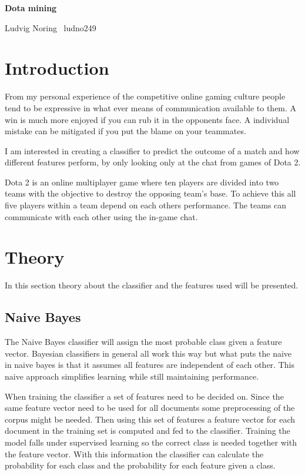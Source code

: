 \documentclass[12pt,a4paper]{article}
\begin{document}
\begin{center}
    \Huge
    \textbf{Dota mining}

    \vspace{0.3cm}
    \large
    Ludvig Noring \
    ludno249

\end{center}

\section{Introduction}
From my personal experience of the competitive online gaming culture
people tend to be expressive in what ever means of communication available to them.
A win is much more enjoyed if you can rub it in the opponents face.
A individual mistake can be mitigated if you put the blame on your teammates.

I am interested in creating a classifier to predict the outcome of a match and how different features perform,
by only looking only at the chat from games of Dota 2.

Dota 2 is an online multiplayer game where ten players are divided into two teams
with the objective to destroy the opposing team's base.
To achieve this all five players within a team depend on each others performance.
The teams can communicate with each other using the in-game chat.

\section{Theory}
In this section theory about the classifier and the features used will be presented.

\subsection{Naive Bayes}
The Naive Bayes classifier will assign the most probable class given a feature vector.
Bayesian classifiers in general all work this way but what puts the naive in naive bayes
is that it assumes all features are independent of each other.
This naive approach simplifies learning while still maintaining performance.\cite{bayes}

When training the classifier a set of features need to be decided on.
Since the same feature vector need to be used for all documents some preprocessing of the corpus
might be needed.
Then using this set of features a feature vector for each document in the training set is
computed and fed to the classifier.
Training the model falls under supervised learning so the correct class is needed together with the feature vector.
With this information the classifier can calculate the probability for each class and the probability for each feature given a class.
\end{document}

